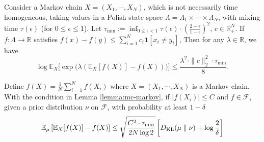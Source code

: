 \begin{lemma}\label{lemma:mc-markov}
	Consider a Markov chain $X=(X_1, \cdots, X_N)$, which is not necessarily time homogeneous, taking values in a Polish state space $\Lambda = \Lambda_1\times \cdots \times \Lambda_N$, with mixing time $\tau(\epsilon)$ (for $0 \leq \epsilon \leq 1$). Let $\tau_{\min}:=\inf_{0\leq\epsilon<1}\tau(\epsilon)\cdot\left(\frac{2-\epsilon}{1-\epsilon}\right)^2$, $c \in \mathbb{R}^N_{+}$. If $f:\Lambda \rightarrow \mathbb{R}$ satisfies $f(x)-f(y)\leq\sum_{i=1}^Nc_i \bm{1}[x_i\neq y_i]$, Then for any $\lambda \in \mathbb{R}$, we have
	$$
	\log\mathbb{E}_X\Big[\exp\big(\lambda(\mathbb{E}_X[f(X)]-f(X))\big)\Big]\leq\frac{\lambda^2\cdot\|c\|_2^2\cdot \tau_{\min}}8.
	$$
\end{lemma}

\begin{proposition}\label{prop0: high-prob}
	Define $f(X)=\frac{1}{N}\sum_{i=1}^N f(X_i)$ where $X=(X_1, \cdots, X_N)$ is a Markov chain. With the condition in Lemma \ref{lemma:mc-markov}, if $|f(X_i)| \leq C$ and $f \in \mathcal{F}$, given a prior distribution $\nu$ on $\mathcal{F}$, with probability at least $1-\delta$
	$$
	\mathbb{E}_\mu\left[\mathbb{E}_X[f(X)] -f(X)\right] \leq \sqrt{\frac{C^2\cdot \tau_{\min}}{2N \log 2}}\left[D_{\mathrm{KL}}(\mu\parallel \nu)+\log \frac{2}{\delta}\right]
	$$
\end{proposition}


